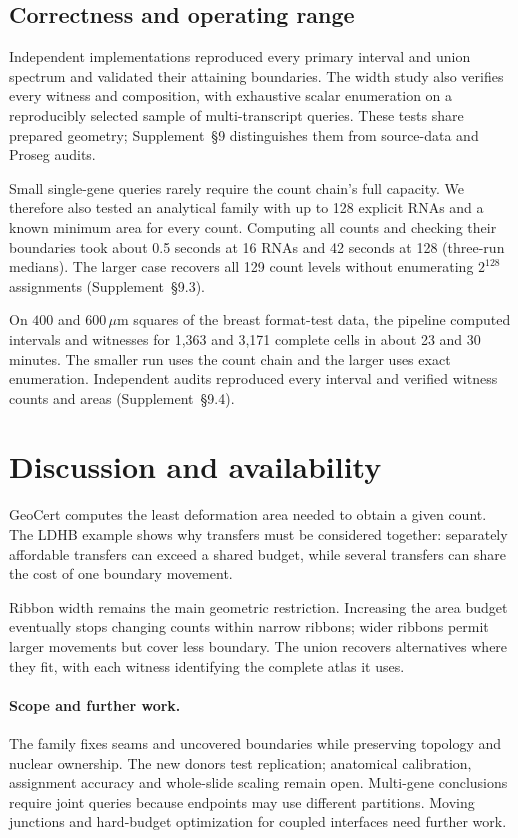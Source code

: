 \documentclass[10pt,letterpaper]{article}
\begin{document}
\FloatBarrier
\subsection{Correctness and operating range}\label{sec:verification}
Independent implementations reproduced every primary interval and union spectrum and validated their attaining boundaries. The width study also verifies every witness and composition, with exhaustive scalar enumeration on a reproducibly selected sample of multi-transcript queries. These tests share prepared geometry; Supplement~\S9 distinguishes them from source-data and Proseg audits.

Small single-gene queries rarely require the count chain's full capacity. We therefore also tested an analytical family with up to 128 explicit RNAs and a known minimum area for every count. Computing all counts and checking their boundaries took about 0.5 seconds at 16 RNAs and 42 seconds at 128 (three-run medians). The larger case recovers all 129 count levels without enumerating $2^{128}$ assignments (Supplement~\S9.3).

On $400$ and $600\,\mu\mathrm m$ squares of the breast format-test data, the pipeline computed intervals and witnesses for 1,363 and 3,171 complete cells in about 23 and 30 minutes. The smaller run uses the count chain and the larger uses exact enumeration. Independent audits reproduced every interval and verified witness counts and areas (Supplement~\S9.4).

\section{Discussion and availability}
GeoCert computes the least deformation area needed to obtain a given count. The LDHB example shows why transfers must be considered together: separately affordable transfers can exceed a shared budget, while several transfers can share the cost of one boundary movement.

Ribbon width remains the main geometric restriction. Increasing the area budget eventually stops changing counts within narrow ribbons; wider ribbons permit larger movements but cover less boundary. The union recovers alternatives where they fit, with each witness identifying the complete atlas it uses.

\paragraph{Scope and further work.}
The family fixes seams and uncovered boundaries while preserving topology and nuclear ownership. The new donors test replication; anatomical calibration, assignment accuracy and whole-slide scaling remain open. Multi-gene conclusions require joint queries because endpoints may use different partitions. Moving junctions and hard-budget optimization for coupled interfaces need further work.
\end{document}
